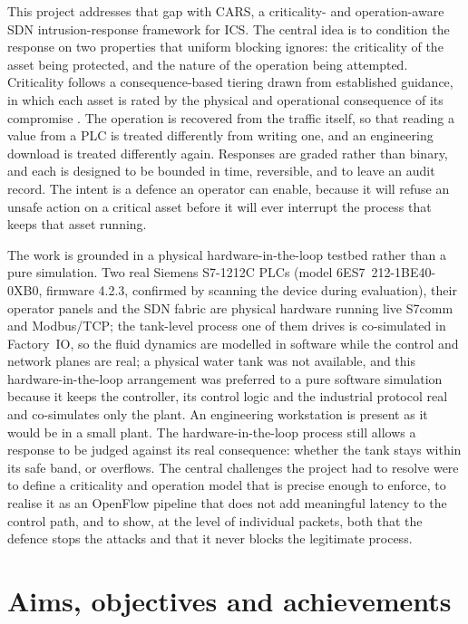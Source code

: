 This project addresses that gap with CARS, a criticality- and operation-aware SDN intrusion-response framework for ICS. The central idea is to condition the response on two properties that uniform blocking ignores: the criticality of the asset being protected, and the nature of the operation being attempted. Criticality follows a consequence-based tiering drawn from established guidance, in which each asset is rated by the physical and operational consequence of its compromise \cite{inl2016cce, cisa2025assetinventory}. The operation is recovered from the traffic itself, so that reading a value from a PLC is treated differently from writing one, and an engineering download is treated differently again. Responses are graded rather than binary, and each is designed to be bounded in time, reversible, and to leave an audit record. The intent is a defence an operator can enable, because it will refuse an unsafe action on a critical asset before it will ever interrupt the process that keeps that asset running.

The work is grounded in a physical hardware-in-the-loop testbed rather than a pure simulation. Two real Siemens S7-1212C PLCs (model 6ES7~212-1BE40-0XB0, firmware 4.2.3, confirmed by scanning the device during evaluation), their operator panels and the SDN fabric are physical hardware running live S7comm and Modbus/TCP; the tank-level process one of them drives is co-simulated in Factory~IO, so the fluid dynamics are modelled in software while the control and network planes are real; a physical water tank was not available, and this hardware-in-the-loop arrangement was preferred to a pure software simulation because it keeps the controller, its control logic and the industrial protocol real and co-simulates only the plant. An engineering workstation is present as it would be in a small plant. The hardware-in-the-loop process still allows a response to be judged against its real consequence: whether the tank stays within its safe band, or overflows. The central challenges the project had to resolve were to define a criticality and operation model that is precise enough to enforce, to realise it as an OpenFlow pipeline that does not add meaningful latency to the control path, and to show, at the level of individual packets, both that the defence stops the attacks and that it never blocks the legitimate process.

\section*{Aims, objectives and achievements}

